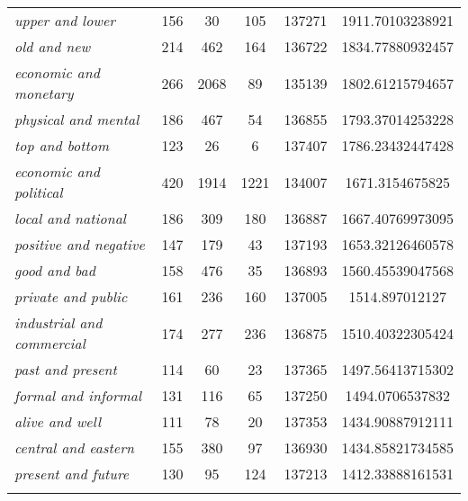\begin{table}
{\begin{tabular}[t]{l *{4}{S[table-format=5]} S}
\textit{upper and lower} & 156 & 30 & 105 & 137271 & 1911.70103238921 \\
\textit{old and new} & 214 & 462 & 164 & 136722 & 1834.77880932457 \\
\textit{economic and monetary} & 266 & 2068 & 89 & 135139 & 1802.61215794657 \\
\textit{physical and mental} & 186 & 467 & 54 & 136855 & 1793.37014253228 \\
\textit{top and bottom} & 123 & 26 & 6 & 137407 & 1786.23432447428 \\
\textit{economic and political} & 420 & 1914 & 1221 & 134007 & 1671.3154675825 \\
\textit{local and national} & 186 & 309 & 180 & 136887 & 1667.40769973095 \\
\textit{positive and negative} & 147 & 179 & 43 & 137193 & 1653.32126460578 \\
\textit{good and bad} & 158 & 476 & 35 & 136893 & 1560.45539047568 \\
\textit{private and public} & 161 & 236 & 160 & 137005 & 1514.897012127 \\
\textit{industrial and commercial} & 174 & 277 & 236 & 136875 & 1510.40322305424 \\
\textit{past and present} & 114 & 60 & 23 & 137365 & 1497.56413715302 \\
\textit{formal and informal} & 131 & 116 & 65 & 137250 & 1494.0706537832 \\
\textit{alive and well} & 111 & 78 & 20 & 137353 & 1434.90887912111 \\
\textit{central and eastern} & 155 & 380 & 97 & 136930 & 1434.85821734585 \\
\textit{present and future} & 130 & 95 & 124 & 137213 & 1412.33888161531 \\
\lspbottomrule
{} \\ %
\end{tabular}}
\end{table}

